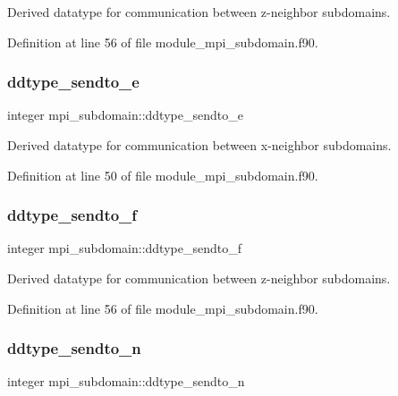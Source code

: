 Derived datatype for communication between z-\/neighbor subdomains. 



Definition at line 56 of file module\+\_\+mpi\+\_\+subdomain.\+f90.

\mbox{\label{namespacempi__subdomain_a93395266b1630e5a91e8e89531dfcec6}} 
\subsubsection{\texorpdfstring{ddtype\_sendto\_e}{ddtype\_sendto\_e}}
{\footnotesize\ttfamily integer mpi\+\_\+subdomain\+::ddtype\+\_\+sendto\+\_\+e}



Derived datatype for communication between x-\/neighbor subdomains. 



Definition at line 50 of file module\+\_\+mpi\+\_\+subdomain.\+f90.

\mbox{\label{namespacempi__subdomain_a4f3d66535b947c7afee75e6e73a47206}} 
\subsubsection{\texorpdfstring{ddtype\_sendto\_f}{ddtype\_sendto\_f}}
{\footnotesize\ttfamily integer mpi\+\_\+subdomain\+::ddtype\+\_\+sendto\+\_\+f}



Derived datatype for communication between z-\/neighbor subdomains. 



Definition at line 56 of file module\+\_\+mpi\+\_\+subdomain.\+f90.

\mbox{\label{namespacempi__subdomain_a55f5c1af9bd941fd176e619bddbb8d82}} 
\subsubsection{\texorpdfstring{ddtype\_sendto\_n}{ddtype\_sendto\_n}}
{\footnotesize\ttfamily integer mpi\+\_\+subdomain\+::ddtype\+\_\+sendto\+\_\+n}



